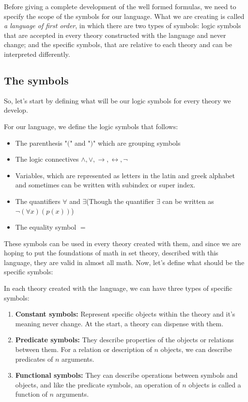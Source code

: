 \documentclass{tufte-handout}
\begin{document}
Before giving a complete development of the well formed formulas, we need to specify the scope of the symbols for our language. What we are creating is called \textit{a language of first order}, in which there are two types of symbols: logic symbols that are accepted in every theory constructed with the language and never change; and the specific symbols, that are relative to each theory and can be interpreted differently.\\

\subsection{The symbols}
So, let's start by defining what will be our logic symbols for every theory we develop.

\begin{definition}
	For our language, we define the logic symbols that follows:
	\begin{itemize}
		\item The parenthesis "$($" and "$)$" which are grouping symbols
		\item The logic connectives $\wedge, \vee, \rightarrow, \leftrightarrow, \neg$
		\item Variables, which are represented as letters in the latin and greek alphabet and sometimes can be written with subindex or super index.
		\item The quantifiers $\forall$ and $\exists$(Though the quantifier $\exists$ can be written as $\neg(\forall x)(p(x))$)
		\item The equality symbol $=$
	\end{itemize}
\end{definition}

These symbols can be used in every theory created with them, and since we are hoping to put the foundations of math in set theory, described with this language, they are valid in almost all math. Now, let's define what should be the specific symbols:

\begin{definition}
	In each theory created with the language, we can have three types of specific symbols:
	\begin{enumerate}
		\item \textbf{Constant symbols:} Represent specific objects within the theory and it's meaning never change. At the start, a theory can dispense with them.
		\item \textbf{Predicate symbols:} They describe properties of the objects or relations between them. For a relation or description of $n$ objects, we can describe predicates of $n$ arguments.
		\item \textbf{Functional symbols:} They can describe operations between symbols and objects, and like the predicate symbols, an operation of $n$ objects is called a function of $n$ arguments.
	\end{enumerate}
\end{definition}
\end{document}
